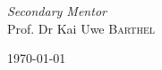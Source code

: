 \begin{titlepage}
\begin{minipage}{0.4\textwidth}
		\begin{flushright}
			\large
			\textit{Secondary Mentor}\\
			Prof. Dr Kai Uwe \textsc{Barthel} %
		\end{flushright}
	\end{minipage}
	
	
	
	
	\vfill\vfill\vfill %
	
	{\large\today} %
	
	

	 
	
	\vfill %
	
\end{titlepage}